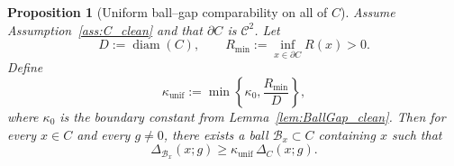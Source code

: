 \documentclass{article}
\DeclareMathOperator{\diam}{diam}
\newtheorem{proposition}{Proposition}
\begin{document}
\begin{proposition}[Uniform ball--gap comparability on all of $C$]
\label{prop:BallGap_global_clean}
Assume Assumption~\ref{ass:C_clean} and that $\partial C$ is $\mathcal{C}^2$. Let
\[
D:=\diam(C),
\qquad
R_{\min}:=\inf_{x\in\partial C}R(x)>0.
\]
Define
\begin{equation}
\kappa_{\mathrm{unif}}
:=
\min\!\left\{\kappa_0,\frac{R_{\min}}{D}\right\},
\label{eq:kappa_unif_def_clean}
\end{equation}
where $\kappa_0$ is the boundary constant from Lemma~\ref{lem:BallGap_clean}. Then for every $x\in C$ and every $g\neq 0$, there exists a ball $\mathcal B_x\subset C$ containing $x$ such that
\begin{equation}
\Delta_{\mathcal B_x}(x;g)\ge \kappa_{\mathrm{unif}}\,\Delta_C(x;g).
\label{eq:BallGapGlobal_clean}
\end{equation}
\end{proposition}
\end{document}
